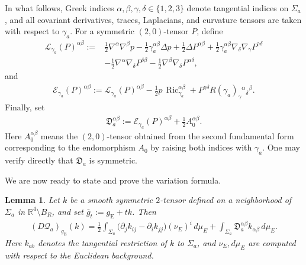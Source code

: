 \documentclass[10pt,a4paper]{amsart}
\newcommand{\R}{\mathbb{R}}
\newcommand{\gE}{g_{\mathrm{E}}}
\newcommand{\Ric}{\operatorname{Ric}}
\newtheorem{lemma}[theorem]{Lemma}
\begin{document}
	In what follows, Greek indices
	$\alpha,\beta,\gamma,\delta\in\{1,2,3\}$ denote tangential indices on
	$\Sigma_a$, and all covariant derivatives, traces, Laplacians, and curvature
	tensors are taken with respect to $\gamma_a$. For a symmetric $(2,0)$-tensor
	$P$, define
	\begin{align*}
		\mathcal L_{\gamma_a}(P)^{\alpha\beta}
		:={}&
		\frac12\nabla^\alpha\nabla^\beta p
		-
		\frac12\gamma_a^{\alpha\beta}\Delta p
		+
		\frac12\Delta P^{\alpha\beta}
		+
		\frac12\gamma_a^{\alpha\beta}
		\nabla_\delta\nabla_\gamma P^{\gamma\delta}
		\\
		&-
		\frac12\nabla^\alpha\nabla_\delta P^{\delta\beta}
		-
		\frac12\nabla^\beta\nabla_\delta P^{\alpha\delta},
	\end{align*}
	and
	\begin{align}\label{eq:BY-def-EP}
		\mathcal E_{\gamma_a}(P)^{\alpha\beta}
		:=
		\mathcal L_{\gamma_a}(P)^{\alpha\beta}
		-
		\frac12p\,\Ric_{\gamma_a}^{\alpha\beta}
		+
		P^{\gamma\delta}
		R(\gamma_a)_\gamma{}^\alpha{}_\delta{}^\beta.
	\end{align}
	Finally, set
	\begin{align}\label{eq:BY-def-D}
		\mathfrak D_a^{\alpha\beta}
		:=
		\mathcal E_{\gamma_a}(P)^{\alpha\beta}
		+
		\frac12A_0^{\alpha\beta}.
	\end{align}
	Here $A_0^{\alpha\beta}$ means the $(2,0)$-tensor obtained from the second fundamental form corresponding to the endomorphism $A_0$ by raising both indices with $\gamma_a$. One may verify directly that $\mathfrak D_a$ is symmetric.
	
	We are now ready to state and prove the variation formula.
	
	\begin{lemma}\label{lem:BY-first-variation-general-hypersurface}
		Let $k$ be a smooth symmetric $2$-tensor defined on a neighborhood of $\Sigma_a$ in $\R^4\setminus B_R$, and set $\bar g_t:=\gE+tk$. Then
		\begin{align}\label{eq:BY-first-variation-with-defect-Q}
			(D\mathcal Q_a)_{\gE}(k)
			=
			\frac12
			\int_{\Sigma_a}
			\bigl(
			\partial_j k_{ij}
			-
			\partial_i k_{jj}
			\bigr)(\nu_E)^i\,d\mu_E
			+
			\int_{\Sigma_a}
			\mathfrak D_a^{\alpha\beta}k_{\alpha\beta}\,d\mu_E .
		\end{align}
		Here $k_{ab}$ denotes the tangential restriction of $k$ to $\Sigma_a$, and
		$\nu_E,d\mu_E$ are computed with respect to the Euclidean background.
	\end{lemma}
	
\end{document}
